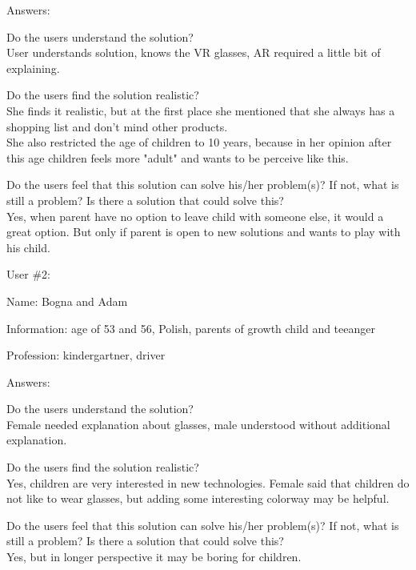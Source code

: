 \documentclass[a4paper,10pt,oneside]{scrreprt}
\begin{document}
Answers:
\begin{compactitem}
	\item Do the users understand the solution?\\
	User understands solution, knows the VR glasses, AR required a little bit of explaining.\\
	
	
	\item Do the users find the solution realistic?\\
	She finds it realistic, but at the first place she mentioned that she always has a shopping list and don't mind other products.\\
    She also restricted the age of children to 10 years, because in her opinion after this age children feels more "adult" and wants to be perceive like this.\\
	
	\item Do the users feel that this solution can solve his/her problem(s)? If not, what is still
	a problem? Is there a solution that could solve this?\\
	Yes, when parent have no option to leave child with someone else, it would a great option. But only if parent is open to new solutions and wants to play with his child.\\
\end{compactitem}
\bigskip

User \#2:
\begin{compactitem}
	\item Name: Bogna and Adam
	\item Information: age of 53 and 56, Polish, parents of growth child and teeanger
	\item Profession: kindergartner, driver
\end{compactitem}
\bigskip

Answers:
\begin{compactitem}
	\item Do the users understand the solution?\\
	Female needed explanation about glasses, male understood without additional explanation.\\
	
	\item Do the users find the solution realistic?\\
	Yes, children are very interested in new technologies. Female said that children do not like to wear glasses, but adding some interesting colorway may be helpful.\\
	
	\item Do the users feel that this solution can solve his/her problem(s)? If not, what is still
	a problem? Is there a solution that could solve this?\\
	Yes, but in longer perspective it may be boring for children.\\
\end{compactitem}
\bigskip
\end{document}

